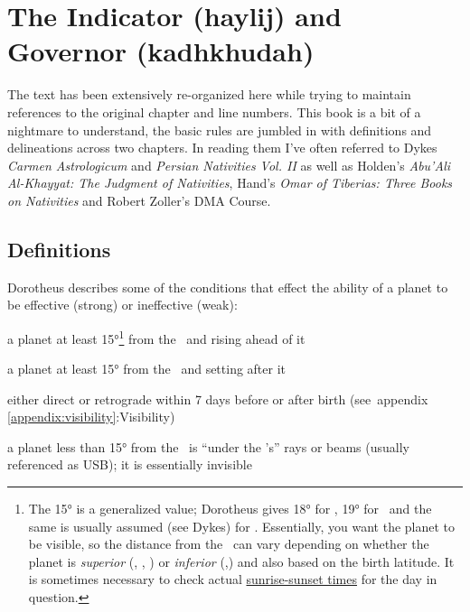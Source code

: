 \section{The Indicator (haylij) and Governor (kadhkhudah)}
\begin{mdframed}[backgroundcolor=cyan!5, rightmargin=1em, leftmargin=1em]
The text has been extensively re-organized here while trying to maintain references to the original chapter and line numbers. This  book is a bit of a nightmare to understand, the basic rules are jumbled in with definitions and delineations across two chapters. In reading them I've often referred to Dykes \textsl{Carmen Astrologicum} and \textsl{Persian Nativities Vol. II} as well as Holden's \textsl{Abu'Ali Al-Khayyat: The Judgment of Nativities}, Hand's \textsl{Omar of Tiberias: Three Books on Nativities} and Robert Zoller's DMA Course.
\end{mdframed}

\subsection{Definitions}
Dorotheus describes some of the conditions that effect the ability of a planet to be effective (strong) or ineffective (weak):
\begin{description}[style=multiline,leftmargin=7em]
\item[Eastern]a planet at least 15°\footnote{The 15° is a generalized value; Dorotheus gives 18° for \Mars, 19° for \Mercury\, and the same is usually assumed (see Dykes) for \Venus. Essentially, you want the planet to be visible, so the distance from the \Sun\, can vary depending on whether the planet is \textsl{superior} (\Saturn, \Jupiter, \Mars) or \textsl{inferior} (\Venus,\Mercury) and also based on the birth latitude. It is sometimes necessary to check actual \href{https://www.sunrise-and-sunset.com/en/sun}{sunrise-sunset times} for the day in question.} from the \Sun\, and rising ahead of it
\item[Western ]a planet at least 15° from the \Sun\, and setting after it
\item[Stationing] either direct or retrograde within 7 days before or after birth (see~appendix \ref{appendix:visibility}:Visibility)
\item[USB] a planet less than 15° from the \Sun\, is ``under the \Sun's'' rays or beams (usually referenced as USB); it is essentially invisible
\end{description}

